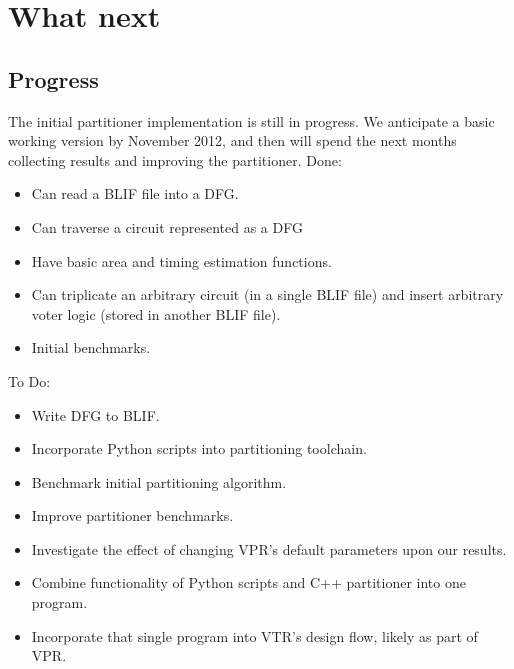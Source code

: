 \documentclass[12pt,final,oneside]{memoir} %
\begin{document}
\chapter{What next}

\section{Progress}
The initial partitioner implementation is still in progress. We anticipate a basic working version by November 2012, and then will spend the next months collecting results and improving the partitioner.
Done:
\begin{itemize}
    \item Can read a \ac{BLIF} file into a \ac{DFG}.
    \item Can traverse a circuit represented as a \ac{DFG}
    \item Have basic area and timing estimation functions.
    \item Can triplicate an arbitrary circuit (in a single \ac{BLIF} file) and insert arbitrary voter logic (stored in another \ac{BLIF} file).
    \item Initial benchmarks.
\end{itemize}
To Do:
\begin{itemize}
    \item Write \ac{DFG} to \ac{BLIF}.
    \item Incorporate Python scripts into partitioning toolchain.
    \item Benchmark initial partitioning algorithm.
    \item Improve partitioner benchmarks.
    \item Investigate the effect of changing \ac{VPR}'s default parameters upon our results.
    \item Combine functionality of Python scripts and C++ partitioner into one program.
    \item Incorporate that single program into \ac{VTR}'s design flow, likely as part of \ac{VPR}.
\end{itemize}
\end{document}
